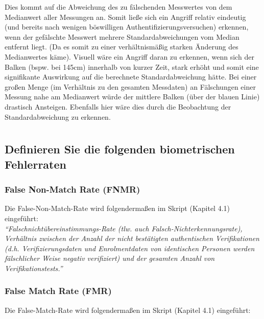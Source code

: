 \documentclass{article}
\begin{document}
Dies kommt auf die Abweichung des zu fälschenden Messwertes von dem Medianwert aller Messungen an.
Somit ließe sich ein Angriff relativ eindeutig (und bereits nach wenigen böswilligen 
Authentifizierungsversuchen) erkennen, wenn der gefälschte Messwert mehrere Standardabweichungen vom 
Median entfernt liegt. (Da es somit zu einer verhältnismäßig starken Änderung des Medianwertes käme). 
Visuell wäre ein Angriff daran zu erkennen, wenn sich der Balken (bspw. bei 145cm) innerhalb von kurzer 
Zeit, stark erhöht und somit eine signifikante Auswirkung auf die berechnete Standardabweichung hätte. Bei 
einer großen Menge (im Verhältnis zu den gesamten Messdaten) an Fälschungen einer Messung nahe am 
Medianwert würde der mittlere Balken (über der blauen Linie) drastisch Ansteigen. Ebenfalls hier wäre
dies durch die Beobachtung der Standardabweichung zu erkennen.

\newpage

\section{}

\subsection{Definieren Sie die folgenden biometrischen Fehlerraten}

\subsubsection{False Non-Match Rate (FNMR)}

Die False-Non-Match-Rate wird folgendermaßen im Skript (Kapitel 4.1) eingeführt:\\[0.1em]

\textit{
``Falschnichtübereinstimmungs-Rate (tlw. auch Falsch-Nichterkennungsrate), Verhältnis zwischen der Anzahl der nicht bestätigten authentischen Verifikationen (d.h. Verifizierungsdaten und Enrolmentdaten von identischen Personen werden fälschlicher Weise negativ verifiziert) und der gesamten Anzahl von Verifikationstests.''
}

\subsubsection{False Match Rate (FMR)}

Die False-Match-Rate wird folgendermaßen im Skript (Kapitel 4.1) eingeführt:\\[0.1em]
\end{document}

